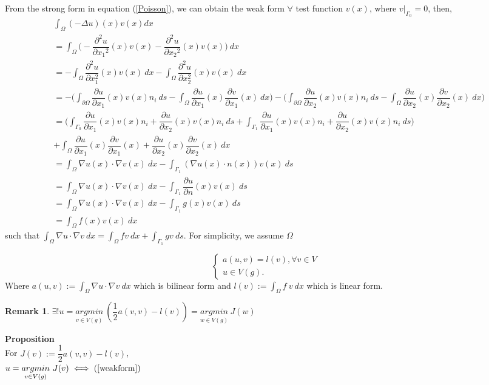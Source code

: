\documentclass[]{report}
\newtheorem{remark}{Remark}[section]
\begin{document}
From the strong form in equation (\ref{Poisson}), we can obtain the weak form
$ \forall $ test function $ v(x) $, where $ v|_{\Gamma_0} = 0 $, then,
\begin{align*}
	&\int_\Omega (-\Delta u)(x) v(x) dx\\
	&= \int_\Omega \Big(-\dfrac{\partial^2u}{\partial{x_1}^2} (x) v(x) -\dfrac{\partial^2u}{\partial{x_2}^2} (x) v(x) \Big) \ dx \\
	&= - \int_{\Omega} \dfrac{\partial^{2}u}{\partial x_{1}^{2}}  (x) v(x) \ dx - \int_{\Omega} \dfrac{\partial^{2} u}{\partial x_{2}^{2}} (x) v(x) \ dx\\
	&= - \Big( \int_{\partial \Omega} \dfrac{\partial u}{\partial x_{1}} (x) v(x) n_{i} \ ds - \int_{\Omega} \dfrac{\partial u}{\partial x_{1}} (x) \dfrac{\partial v}{\partial x_{1}} (x) \ dx \Big) - \Big( \int_{\partial \Omega} \dfrac{\partial u}{\partial x_{2}} (x) v(x) n_{i} \ ds - \int_{\Omega} \dfrac{\partial u}{\partial x_{2}} (x) \dfrac{\partial v}{\partial x_{2}} (x) \ dx \Big)\\
	&= \Big( \int_{\Gamma_0} \dfrac{\partial u}{\partial x_{1}} (x) v(x) n_{i} + \dfrac{\partial u}{\partial x_{2}} (x) v(x) n_{i} \ ds + \int_{\Gamma_1} \dfrac{\partial u}{\partial x_{1}} (x) v(x) n_{i} + \dfrac{\partial u}{\partial x_{2}} (x) v(x) n_{i} \ ds \Big) \\
	&+ \int_{\Omega} \dfrac{\partial u}{\partial x_{1}} (x) \dfrac{\partial v}{\partial x_{1}} (x) + \dfrac{\partial u}{\partial x_{2}} (x) \dfrac{\partial v}{\partial x_{2}} (x) \ dx \\
	&= \int_{\Omega} \nabla u(x) \cdot \nabla v(x) \ dx - \int_{\Gamma_1} (\nabla u(x) \cdot n(x)) v(x) \ ds \\
	&= \int_{\Omega} \nabla u(x) \cdot \nabla v(x) \ dx - \int_{\Gamma_1} \dfrac{\partial u}{\partial n} (x) v(x) \ ds \\
	&= \int_{\Omega} \nabla u(x) \cdot \nabla v(x) \ dx - \int_{\Gamma_1} g(x) v(x) \ ds\\
	&= \int_{\Omega} f(x) v(x) \ dx
\end{align*}
such that $ \int_{\Omega} \nabla u \cdot \nabla v \ dx = \int_{\Omega} f v \ dx + \int_{\Gamma_1} g v \ ds $. For simplicity, we assume $ \Omega $

\begin{equation}\label{weakform}
\begin{cases}
a(u,v) = l(v), \forall v \in V \\
u \in V(g).
\end{cases}
\end{equation}
Where $ a(u,v) := \int_{\Omega} \nabla u \cdot \nabla v \ dx$ which is bilinear form and $ l(v) := \int_{\Omega} f \ v \ dx $ which is linear form.
\begin{remark}
	$ \exists ! u = \underset{v \in V(g)}{argmin} \ (\dfrac{1}{2} a(v,v)-l(v)) = \underset{w \in V(g)}{argmin} \ J(w)$
\end{remark}
\textbf{Proposition}\\
For $ J(v) := \dfrac{1}{2} a(v,v) -l (v) $,\\
$ u = \underset{v \in V(g)}{argmin} \ J(v) \iff (\ref{weakform}) $
\end{document}
